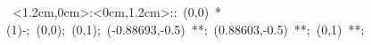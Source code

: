 %


\hbox{
\xy    <1.2cm,0cm>:<0cm,1.2cm>::
       (0,0) *\ellipse(1){-}; (0,0); 
       (0,1); (-0.88693,-0.5) **\dir{-}; 
       (0.88603,-0.5) **\dir{-}; 
       (0,1) **\dir{-};
\endxy}

